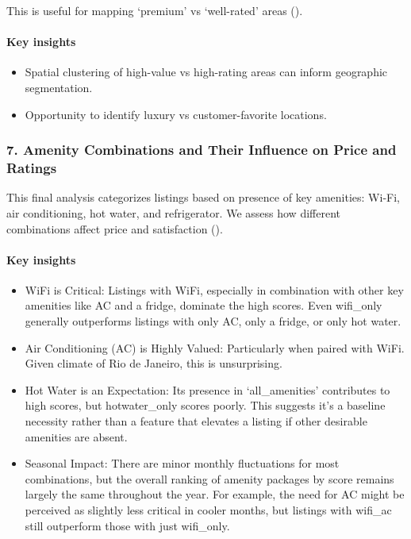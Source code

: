 This is useful for mapping `premium' vs `well-rated' areas ().

\vspace{0.5em}
\paragraph{Key insights}
\begin{itemize}
    \item Spatial clustering of high-value vs high-rating areas can inform geographic segmentation.
    \item Opportunity to identify luxury vs customer-favorite locations.
\end{itemize}


\subsubsection*{7. Amenity Combinations and Their Influence on Price and Ratings}

This final analysis categorizes listings based on presence of key amenities: Wi-Fi, air conditioning, hot water, and refrigerator. We assess how different combinations affect price and satisfaction ().

\vspace{0.5em}
\paragraph{Key insights}
\begin{itemize}
    \item WiFi is Critical: Listings with WiFi, especially in combination with other key amenities like AC and a fridge, dominate the high scores. Even wifi\_only generally outperforms listings with only AC, only a fridge, or only hot water.
    \item Air Conditioning (AC) is Highly Valued: Particularly when paired with WiFi. Given climate of Rio de Janeiro, this is unsurprising.
    \item Hot Water is an Expectation: Its presence in `all\_amenities' contributes to high scores, but hotwater\_only scores poorly. This suggests it's a baseline necessity rather than a feature that elevates a listing if other desirable amenities are absent.
    \item Seasonal Impact: There are minor monthly fluctuations for most combinations, but the overall ranking of amenity packages by score remains largely the same throughout the year. For example, the need for AC might be perceived as slightly less critical in cooler months, but listings with wifi\_ac still outperform those with just wifi\_only.
\end{itemize}

